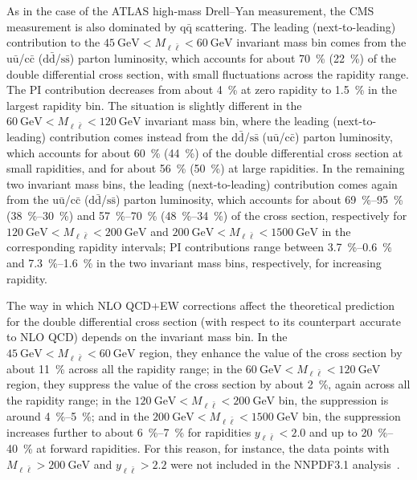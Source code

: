 As in the case of the ATLAS high-mass Drell--Yan measurement, the CMS
measurement is also dominated by $\mathrm{q}\bar{\mathrm{q}}$ scattering. The leading
(next-to-leading) contribution to the $\SI{45}{\giga\electronvolt}<M_{\ell\bar\ell}<\SI{60}{\giga\electronvolt}$ invariant
mass bin comes from
the $\mathrm{u}\bar{\mathrm{u}}$/$\mathrm{c}\bar{\mathrm{c}}$ ($\mathrm{d}\bar{\mathrm{d}}$/$\mathrm{s}\bar{\mathrm{s}}$) parton luminosity, which accounts for about \SI{70}{\percent}
(\SI{22}{\percent}) of the double differential cross section, with small fluctuations across
the rapidity range. The PI contribution decreases from about \SI{4}{\percent} at zero
rapidity to \SI{1.5}{\percent} in the largest rapidity bin. The situation is slightly
different in the $\SI{60}{\giga\electronvolt}<M_{\ell\bar\ell}<\SI{120}{\giga\electronvolt}$ invariant mass bin, where the
leading (next-to-leading) contribution comes instead from the $\mathrm{d}\bar{\mathrm{d}}$/$\mathrm{s}\bar{\mathrm{s}}$
($\mathrm{u}\bar{\mathrm{u}}$/$\mathrm{c}\bar{\mathrm{c}}$) parton luminosity, which accounts for about \SI{60}{\percent} (\SI{44}{\percent}) of the
double differential cross section at small rapidities, and for about \SI{56}{\percent} (\SI{50}{\percent})
at large rapidities. In the remaining two invariant mass bins, the leading
(next-to-leading) contribution comes again from the $\mathrm{u}\bar{\mathrm{u}}$/$\mathrm{c}\bar{\mathrm{c}}$ ($\mathrm{d}\bar{\mathrm{d}}$/$\mathrm{s}\bar{\mathrm{s}}$)
parton luminosity, which accounts for about \SIrange{69}{95}{\percent} (\SIrange{38}{30}{\percent}) and
\SIrange{57}{70}{\percent} (\SIrange{48}{34}{\percent}) of the cross section, respectively for
$\SI{120}{\giga\electronvolt}<M_{\ell\bar\ell}<\SI{200}{\giga\electronvolt}$ and $\SI{200}{\giga\electronvolt}<M_{\ell\bar\ell}<\SI{1500}{\giga\electronvolt}$ in the
corresponding rapidity intervals; PI contributions range between \SIrange{3.7}{0.6}{\percent}
and \SIrange{7.3}{1.6}{\percent} in the two invariant mass bins, respectively, for increasing
rapidity.

The way in which NLO QCD+EW corrections affect the theoretical prediction for
the double differential cross section (with respect to its counterpart accurate
to NLO QCD) depends on the invariant mass bin. In the
$\SI{45}{\giga\electronvolt}<M_{\ell\bar\ell}<\SI{60}{\giga\electronvolt}$ region, they enhance the value of the cross
section by about \SI{11}{\percent} across all the rapidity range; in the
$\SI{60}{\giga\electronvolt}<M_{\ell\bar\ell}<\SI{120}{\giga\electronvolt}$ region, they suppress the value of the cross
section by about \SI{2}{\percent}, again across all the rapidity range; in the
$\SI{120}{\giga\electronvolt}<M_{\ell\bar\ell}<\SI{200}{\giga\electronvolt}$ bin, the suppression is around \SIrange{4}{5}{\percent}; and in
the $\SI{200}{\giga\electronvolt}<M_{\ell\bar\ell}<\SI{1500}{\giga\electronvolt}$ bin, the suppression increases further to
about \SIrange{6}{7}{\percent} for rapidities $y_{\ell\bar\ell}<2.0$ and up to \SIrange{20}{40}{\percent} at forward
rapidities. For this reason, for instance, the data points with
$M_{\ell\bar\ell}>\SI{200}{\giga\electronvolt}$ and $y_{\ell\bar\ell}>2.2$ were not included in the
NNPDF3.1 analysis~\cite{Ball:2017nwa}.

